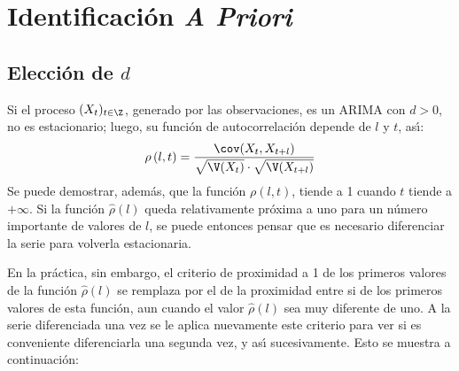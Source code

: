 \section{Identificación \emph{A Priori}  }


\subsection{Elecci\'{o}n de $d$}


Si el proceso 
$(X_t)_{t\in \Z}$, generado por las observaciones, es un ARIMA con $d > 0$, 
no es estacionario; luego, su funci\'{o}n de autocorrelaci\'{o}n depende de 
$l$ y $t$, as\'{\i}:
\[
\rho \left( l,t \right)=\frac{\cov(X_{t},X_{t+l})}{\sqrt {\V(X_{t})} \cdot 
\sqrt {\V(X_{t+l})} }
\]
Se puede demostrar, adem\'{a}s, que la funci\'{o}n $\rho (l, t)$, tiende 
a 1 cuando $t$ tiende a $+\infty $. Si la funci\'{o}n $\widehat{\rho 
}(l)$ queda relativamente pr\'{o}xima a uno para un n\'{u}mero importante de 
valores de $l$, se puede entonces pensar que es necesario diferenciar la 
serie para volverla estacionaria.

En la pr\'{a}ctica, sin embargo, el criterio de proximidad a 1 de los 
primeros valores de la funci\'{o}n $\widehat{\rho }(l)$ se remplaza por el de la 
proximidad entre si de los primeros valores de esta funci\'{o}n, aun cuando 
el valor $\widehat{\rho }(l)$ sea muy diferente de uno. A la serie diferenciada 
una vez se le aplica nuevamente este criterio para ver si es conveniente 
diferenciarla una segunda vez, y as\'{\i} sucesivamente. Esto se muestra a 
continuaci\'{o}n:

